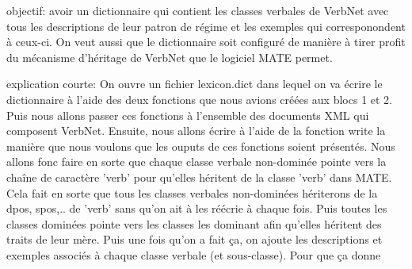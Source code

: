objectif: avoir un dictionnaire qui contient les classes verbales de VerbNet avec tous les descriptions de leur patron de régime  et les exemples qui corresponondent à ceux-ci. On veut aussi que le dictionnaire soit configuré de manière à tirer profit du mécanisme d'héritage de VerbNet que le logiciel MATE permet.

explication courte: On ouvre un fichier lexicon.dict dans lequel on va écrire le dictionnaire à l'aide des deux fonctions que nous avions créées aux blocs 1 et 2. Puis nous allons passer ces fonctions à l'ensemble des documents XML qui composent VerbNet. Ensuite, nous allons écrire à l'aide de la fonction write la manière que nous voulons que les ouputs de ces fonctions soient présentés. Nous allons fonc faire en sorte que chaque classe verbale non-dominée pointe vers la chaîne de caractère 'verb' pour qu'elles héritent de la classe 'verb' dans MATE. Cela fait en sorte que tous les classes verbales non-dominées hériterons de la dpos, spos,.. de 'verb' sans qu'on ait à les réécrie à chaque fois. Puis toutes les classes dominées pointe vers les classes les dominant afin qu'elles héritent des traits de leur mère. Puis une fois qu'on a fait ça, on ajoute les descriptions et exemples associés à chaque classe verbale (et sous-classe). Pour que ça donne 

